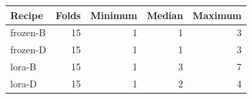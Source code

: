 
{\small\setlength{\tabcolsep}{4pt}
\begin{tabularx}{\textwidth}{Xrrrr}
\toprule
Recipe & Folds & Minimum & Median & Maximum \\
\midrule
frozen-B & 15 & 1 & 1 & 3 \\
frozen-D & 15 & 1 & 1 & 3 \\
lora-B & 15 & 1 & 3 & 7 \\
lora-D & 15 & 1 & 2 & 4 \\
\bottomrule
\end{tabularx}}
